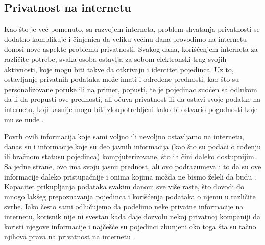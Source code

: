\documentclass[a4paper]{article}
\begin{document}
\subsection{Privatnost na internetu}
\label{subsec:privatnostNaInternetu}
Kao što je već pomenuto, sa razvojem interneta, problem shvatanja privatnosti se dodatno komplikuje  i činjenica  da  veliku  većinu  dana  provodimo  na  internetu  donosi nove  aspekte  problemu  privatnosti. Svakog  dana, korišćenjem interneta za različite potrebe, svaka osoba ostavlja za sobom elektronski trag svojih aktivnosti, koje mogu biti takve da otkrivaju i identitet pojedinca. Uz to, ostavljanje privatnih podataka može imati i određene prednosti, kao što su personalizovane poruke ili na primer, popusti, te je pojedinac suočen sa odlukom da li da propusti ove prednosti, ali očuva privatnost ili da ostavi svoje podatke na internetu, koji kasnije mogu biti zloupotrebljeni kako bi ostvario pogodnosti koje mu se nude \cite{renata}.
\par Povrh ovih informacija koje sami voljno ili nevoljno ostavljamo na internetu, danas su i informacije koje su deo javnih informacija (kao što su podaci o rođenju ili bračnom statusu pojedinca) kompjuterizovane, što ih čini daleko dostupnijim. Sa jedne strane, ovo ima svoju jasnu prednost, ali ovo podrazumeva i to da su ove informacije daleko pristupačnije i onima kojima možda ne bismo želeli da budu \cite{ethics}. Kapacitet prikupljanja podataka svakim danom sve više raste, što dovodi  do mnogo lakšeg prepoznavanja pojedinca i korišćenja podataka o njemu u različite svrhe. Iako često sami odlučujemo da podelimo neke privatne informacije na internetu, korisnik nije ni svestan kada daje dozvolu nekoj privatnoj kompaniji da koristi njegove informacije i najčešće su pojedinci zbunjeni oko toga šta su tačno njihova prava na privatnost na internetu \cite{renata}.
\end{document}

